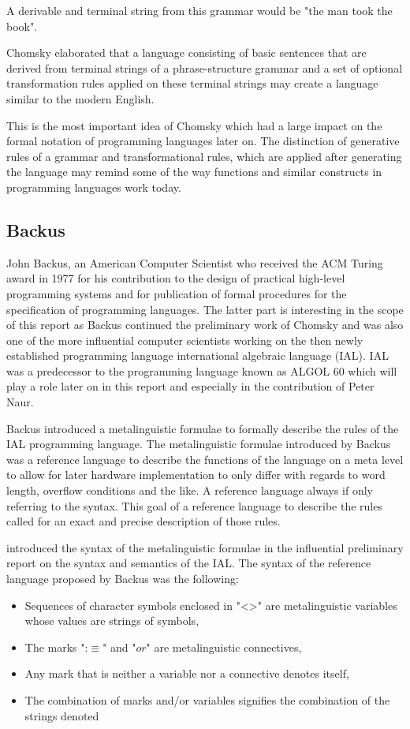 \documentclass{article}
\begin{document}
A derivable and terminal string from this grammar would be "the man took the book".

Chomsky elaborated that a language consisting of basic sentences that are derived from terminal strings of a phrase-structure grammar and a set of optional transformation rules applied on these terminal strings may create a language similar to the modern English. 

This is the most important idea of Chomsky which had a large impact on the formal notation of programming languages later on. The distinction of generative rules of a grammar and transformational rules, which are applied after generating the language may remind some of the way functions and similar constructs in programming languages work today.

\subsection{Backus}
John Backus, an American Computer Scientist who received the ACM Turing award in 1977 for his contribution to the design of practical high-level programming systems and for publication of formal procedures for the specification of programming languages. The latter part is interesting in the scope of this report as Backus continued the preliminary work of Chomsky and was also one of the more influential computer scientists working on the then newly established programming language international algebraic language (IAL). IAL was a predecessor to the programming language known as ALGOL 60 which will play a role later on in this report and especially in the contribution of Peter Naur. 

Backus introduced a metalinguistic formulae to formally describe the rules of the IAL programming language. The metalinguistic formulae introduced by Backus was a reference language to describe the functions of the language on a meta level to allow for later hardware implementation to only differ with regards to word length, overflow conditions and the like. A reference language always if only referring to the syntax. This goal of a reference language to describe the rules called for an exact and precise description of those rules. 

\cite{Backus1959TheSA} introduced the syntax of the metalinguistic formulae in the influential preliminary report on the syntax and semantics of the IAL. The syntax of the reference language proposed by Backus was the following:
\\
\begin{itemize}
	\item Sequences of character symbols enclosed in "<>" are metalinguistic variables whose values are strings of symbols,
	\item The marks ":$\equiv$" and "$or$" are metalinguistic connectives,
	\item Any mark that is neither a variable nor a connective denotes itself,
	\item The combination of marks and/or variables signifies the combination of the strings denoted
\end{itemize} 
\end{document}
